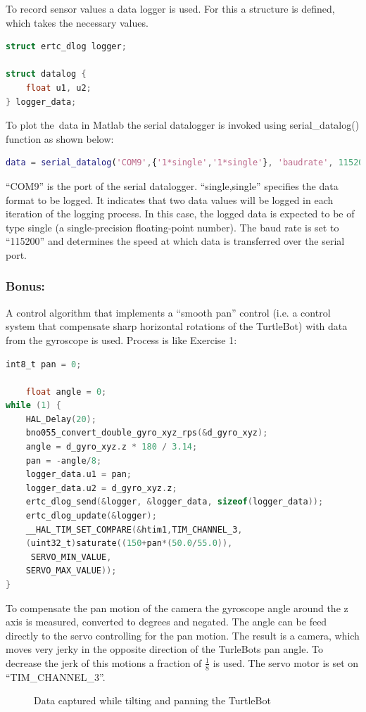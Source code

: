 \documentclass[english]{article}
\begin{document}
  To record sensor values a data logger is used. For this a structure is defined, which takes the necessary values. 
\begin{lstlisting}[language=C, caption={DataLog structure}, label={lst:datalog} ]
struct ertc_dlog logger; 

struct datalog { 
    float u1, u2; 
} logger_data;  
\end{lstlisting} 
To plot the\ data in Matlab the serial datalogger is invoked using serial\_datalog()
 function as shown below: 
\begin{lstlisting}[language=Matlab, caption={MATLAB DATA LOGGER}, label={lst:serialDatalog} ]
data = serial_datalog('COM9',{'1*single','1*single'}, 'baudrate', 115200)
\end{lstlisting}
“COM9” is the port of the serial datalogger. “single,single” specifies the data 
format to be logged. It indicates that two data values will be logged in each 
iteration of the logging process. In this case, the logged data is expected to be
of type single (a single-precision floating-point number).\newline  
The baud rate is set to “115200” and determines the speed at which data
is transferred over the serial port.

\subsubsection{Bonus:}
A control algorithm that implements a “smooth pan” control
(i.e. a control system that compensate sharp horizontal rotations of the TurtleBot) 
with data from the gyroscope is used.\newline
Process is like Exercise 1:

\begin{lstlisting}[language=C, caption={Control Algorithm}, label={lst:smoothPan} ]
    int8_t pan = 0; 

    float angle = 0; 
while (1) { 
    HAL_Delay(20); 
    bno055_convert_double_gyro_xyz_rps(&d_gyro_xyz);
    angle = d_gyro_xyz.z * 180 / 3.14;
    pan = -angle/8;
    logger_data.u1 = pan; 
    logger_data.u2 = d_gyro_xyz.z; 
    ertc_dlog_send(&logger, &logger_data, sizeof(logger_data)); 
    ertc_dlog_update(&logger); 
    __HAL_TIM_SET_COMPARE(&htim1,TIM_CHANNEL_3,
    (uint32_t)saturate((150+pan*(50.0/55.0)),
     SERVO_MIN_VALUE,
    SERVO_MAX_VALUE));   
} 
\end{lstlisting}
 To compensate the pan motion of the camera the gyroscope angle around the z 
 axis is measured, converted to degrees and negated. The angle can be feed 
 directly to the servo controlling for the pan motion. The result is a camera,
 which moves very jerky in the opposite direction of the TurleBots pan angle. 
 To decrease the jerk of this motions a fraction of $\frac{1}{8}$ is used.
  The servo motor is set on “TIM\_CHANNEL\_3”.
\begin{figure}[tbh]
    \centering
    
    \caption{Data captured while tilting and panning the TurtleBot}
    \label{fig:datal2}
\end{figure}
\end{document}
